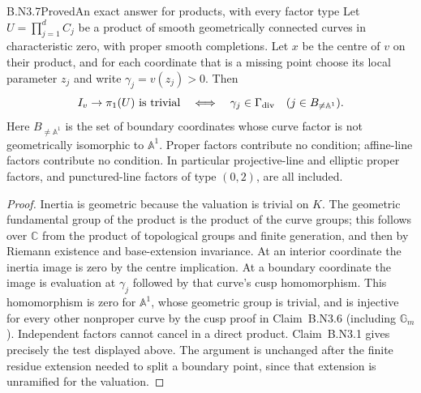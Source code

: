\begin{claim}{B.N3.7}{Proved}{An exact answer for products, with every factor type}
Let $U=\prod_{j=1}^d C_j$ be a product of smooth geometrically
connected curves in characteristic zero, with proper smooth
completions.  Let $x$ be the centre of $v$ on their product, and for
each coordinate that is a missing point choose its local parameter
$z_j$ and write $\gamma_j=v(z_j)>0$.  Then
\[
 I_v\to\pi_1(U)\text{ is trivial}
 \quad\Longleftrightarrow\quad
 \gamma_j\in\Gamma_{\rm div}\quad(j\in B_{\ne\mathbb A^1}).
\]
Here $B_{\ne\mathbb A^1}$ is the set of boundary coordinates whose
curve factor is not geometrically isomorphic to $\mathbb A^1$.
Proper factors contribute no condition; affine-line factors
contribute no condition.  In particular projective-line and elliptic
proper factors, and punctured-line factors of type $(0,2)$, are all
included.
\end{claim}
\begin{proof}
Inertia is geometric because the valuation is trivial on $K$.
The geometric fundamental group of the product is the product of
the curve groups; this follows over $\mathbb C$ from the product
of topological groups and finite generation, and then by Riemann
existence and base-extension invariance.  At an interior coordinate
the inertia image is zero by the centre implication.  At a boundary
coordinate the image is evaluation at $\gamma_j$ followed by that
curve's cusp homomorphism.  This homomorphism is zero for
$\mathbb A^1$, whose geometric group is trivial, and is injective
for every other nonproper curve by the cusp proof in
Claim~B.N3.6 (including $\mathbb G_m$).  Independent factors cannot
cancel in a direct product.  Claim~B.N3.1 gives precisely the test
displayed above.  The argument is unchanged after the finite residue
extension needed to split a boundary point, since that extension is
unramified for the valuation.
\end{proof}

